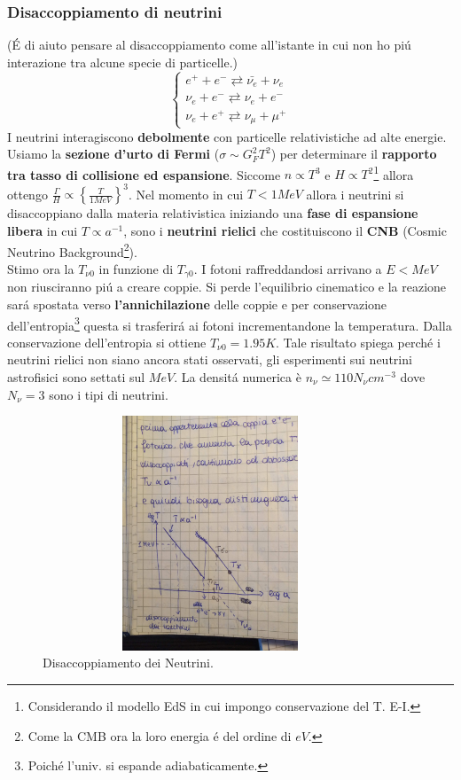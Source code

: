 \documentclass[12pt, a4paper]{article}
\begin{document}
\subsubsection{Disaccoppiamento di neutrini}
(\'{E} di aiuto pensare al disaccoppiamento come all'istante in cui non ho pi\'{u} interazione tra alcune specie di particelle.)\\
\begin{equation}
    \begin{cases}
    e^{+} + e^{-}  \rightleftarrows \bar{\nu_e} + \nu_e 
    \\
    \nu_{e} + e^- \rightleftarrows \nu_{e} + e^-
    \\
    \nu_{e} + e^+ \rightleftarrows \nu_{\mu} + \mu^+
    \end{cases}
\end{equation}
I neutrini interagiscono \textbf{debolmente} con particelle relativistiche ad alte energie. Usiamo la \textbf{sezione d'urto di Fermi} ($\sigma \sim G_F^2T^2$) per determinare il \textbf{rapporto tra tasso di collisione ed espansione}. Siccome $n\propto T^3$ e $H \propto T^2 $\footnote{Considerando il modello EdS in cui impongo conservazione del T. E-I.} allora ottengo $\frac{\Gamma}{H}\propto \left\{\frac{T}{1 MeV}\right\}^3$. Nel momento in cui $T<1MeV$ allora i neutrini si disaccoppiano dalla materia relativistica iniziando una \textbf{fase di espansione libera} in cui $T\propto a^{-1}$, sono i \textbf{neutrini rielici} che costituiscono il \textbf{CNB} (Cosmic Neutrino Background\footnote{Come la CMB ora la loro energia \'{e} del ordine di $eV$.}).\\
Stimo ora la $T_{\nu 0}$ in funzione di $T_{\gamma 0}$. I fotoni raffreddandosi arrivano a $E<MeV$ non riusciranno pi\'{u} a creare coppie. Si perde l'equilibrio cinematico e la reazione sar\'{a} spostata verso \textbf{l'annichilazione} delle coppie e per conservazione dell'entropia\footnote{Poich\'{e} l'univ. si espande adiabaticamente.} questa si trasferir\'{a} ai fotoni incrementandone la temperatura. Dalla conservazione dell'entropia si ottiene $T_{\nu 0}=1.95K$. Tale risultato spiega perch\'{e} i neutrini rielici non siano ancora stati osservati, gli esperimenti sui neutrini astrofisici sono settati sul $MeV$. La densit\'{a} numerica è $n_{\nu}\simeq 110 N_{\nu} cm^{-3}$ dove $N_{\nu}=3$ sono i tipi di neutrini.
\begin{figure}[htp]
    \centering
    \includegraphics[width=10cm, height=7cm]{images/disaccoppiamento.jpg}
    \caption{Disaccoppiamento dei Neutrini.}
    \label{fig:neutrini}
\end{figure}
\end{document}
